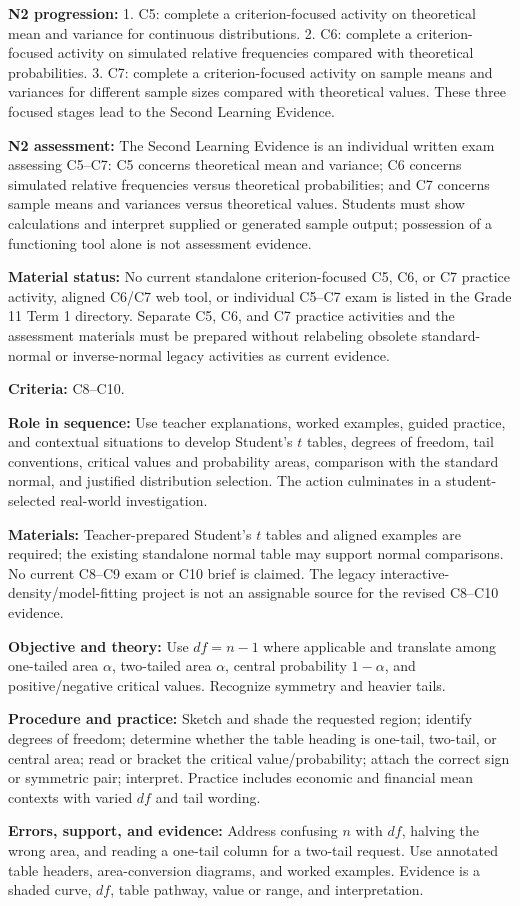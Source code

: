 \documentclass[10pt,letterpaper]{article}
\newcommand{\labelled}[2]{\textbf{#1:} #2\par}
\newcommand{\plansubsection}[1]{\Needspace{7\baselineskip}\par\vspace{5pt}{\normalsize\bfseries #1\par}\vspace{1pt}}
\newcommand{\criterionpart}[1]{\Needspace{10\baselineskip}\par\vspace{4pt}{\bfseries #1\par}}
\begin{document}
	\labelled{N2 progression}{1. C5: complete a criterion-focused activity on theoretical mean and variance for continuous distributions. 2. C6: complete a criterion-focused activity on simulated relative frequencies compared with theoretical probabilities. 3. C7: complete a criterion-focused activity on sample means and variances for different sample sizes compared with theoretical values. These three focused stages lead to the Second Learning Evidence.}
	\labelled{N2 assessment}{The Second Learning Evidence is an individual written exam assessing C5--C7: C5 concerns theoretical mean and variance; C6 concerns simulated relative frequencies versus theoretical probabilities; and C7 concerns sample means and variances versus theoretical values. Students must show calculations and interpret supplied or generated sample output; possession of a functioning tool alone is not assessment evidence.}
	\labelled{Material status}{No current standalone criterion-focused C5, C6, or C7 practice activity, aligned C6/C7 web tool, or individual C5--C7 exam is listed in the Grade 11 Term 1 directory. Separate C5, C6, and C7 practice activities and the assessment materials must be prepared without relabeling obsolete standard-normal or inverse-normal legacy activities as current evidence.}
	
	\plansubsection{Pedagogical Action N3 -- Student's t, Normal Comparison, and Real-Data Investigation}
	\labelled{Criteria}{C8--C10.}
	\labelled{Role in sequence}{Use teacher explanations, worked examples, guided practice, and contextual situations to develop Student's $t$ tables, degrees of freedom, tail conventions, critical values and probability areas, comparison with the standard normal, and justified distribution selection. The action culminates in a student-selected real-world investigation.}
	\labelled{Materials}{Teacher-prepared Student's $t$ tables and aligned examples are required; the existing standalone normal table may support normal comparisons. No current C8--C9 exam or C10 brief is claimed. The legacy interactive-density/model-fitting project is not an assignable source for the revised C8--C10 evidence.}
	
	\criterionpart{C8 -- Student's t tables, degrees of freedom, and areas}
	\labelled{Objective and theory}{Use $df=n-1$ where applicable and translate among one-tailed area $\alpha$, two-tailed area $\alpha$, central probability $1-\alpha$, and positive/negative critical values. Recognize symmetry and heavier tails.}
	\labelled{Procedure and practice}{Sketch and shade the requested region; identify degrees of freedom; determine whether the table heading is one-tail, two-tail, or central area; read or bracket the critical value/probability; attach the correct sign or symmetric pair; interpret. Practice includes economic and financial mean contexts with varied $df$ and tail wording.}
	\labelled{Errors, support, and evidence}{Address confusing $n$ with $df$, halving the wrong area, and reading a one-tail column for a two-tail request. Use annotated table headers, area-conversion diagrams, and worked examples. Evidence is a shaded curve, $df$, table pathway, value or range, and interpretation.}
	
\end{document}
